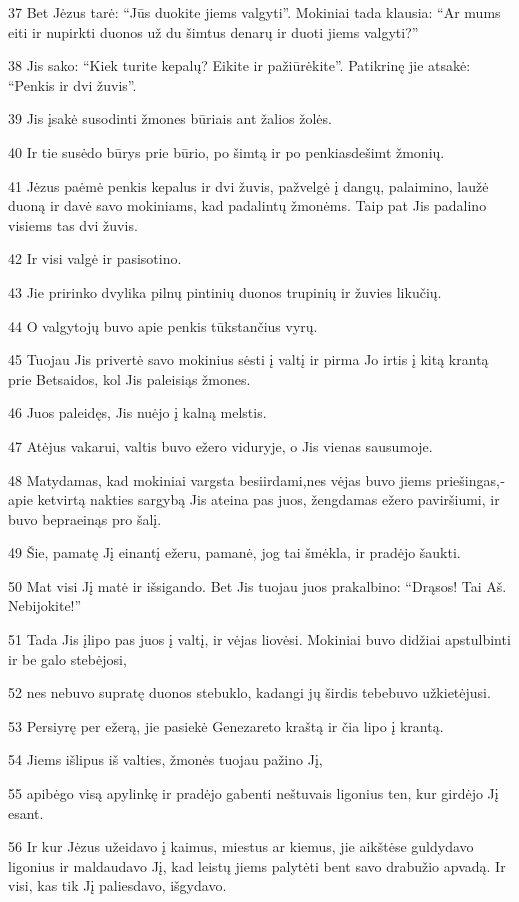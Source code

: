 \par 37 Bet Jėzus tarė: “Jūs duokite jiems valgyti”. Mokiniai tada klausia: “Ar mums eiti ir nupirkti duonos už du šimtus denarų ir duoti jiems valgyti?” 
\par 38 Jis sako: “Kiek turite kepalų? Eikite ir pažiūrėkite”. Patikrinę jie atsakė: “Penkis ir dvi žuvis”. 
\par 39 Jis įsakė susodinti žmones būriais ant žalios žolės. 
\par 40 Ir tie susėdo būrys prie būrio, po šimtą ir po penkiasdešimt žmonių. 
\par 41 Jėzus paėmė penkis kepalus ir dvi žuvis, pažvelgė į dangų, palaimino, laužė duoną ir davė savo mokiniams, kad padalintų žmonėms. Taip pat Jis padalino visiems tas dvi žuvis. 
\par 42 Ir visi valgė ir pasisotino. 
\par 43 Jie pririnko dvylika pilnų pintinių duonos trupinių ir žuvies likučių. 
\par 44 O valgytojų buvo apie penkis tūkstančius vyrų. 
\par 45 Tuojau Jis privertė savo mokinius sėsti į valtį ir pirma Jo irtis į kitą krantą prie Betsaidos, kol Jis paleisiąs žmones. 
\par 46 Juos paleidęs, Jis nuėjo į kalną melstis. 
\par 47 Atėjus vakarui, valtis buvo ežero viduryje, o Jis vienas sausumoje. 
\par 48 Matydamas, kad mokiniai vargsta besiirdami,­nes vėjas buvo jiems priešingas,­apie ketvirtą nakties sargybą Jis ateina pas juos, žengdamas ežero paviršiumi, ir buvo bepraeinąs pro šalį. 
\par 49 Šie, pamatę Jį einantį ežeru, pamanė, jog tai šmėkla, ir pradėjo šaukti. 
\par 50 Mat visi Jį matė ir išsigando. Bet Jis tuojau juos prakalbino: “Drąsos! Tai Aš. Nebijokite!” 
\par 51 Tada Jis įlipo pas juos į valtį, ir vėjas liovėsi. Mokiniai buvo didžiai apstulbinti ir be galo stebėjosi, 
\par 52 nes nebuvo supratę duonos stebuklo, kadangi jų širdis tebebuvo užkietėjusi. 
\par 53 Persiyrę per ežerą, jie pasiekė Genezareto kraštą ir čia lipo į krantą. 
\par 54 Jiems išlipus iš valties, žmonės tuojau pažino Jį, 
\par 55 apibėgo visą apylinkę ir pradėjo gabenti neštuvais ligonius ten, kur girdėjo Jį esant. 
\par 56 Ir kur Jėzus užeidavo į kaimus, miestus ar kiemus, jie aikštėse guldydavo ligonius ir maldaudavo Jį, kad leistų jiems palytėti bent savo drabužio apvadą. Ir visi, kas tik Jį paliesdavo, išgydavo.



